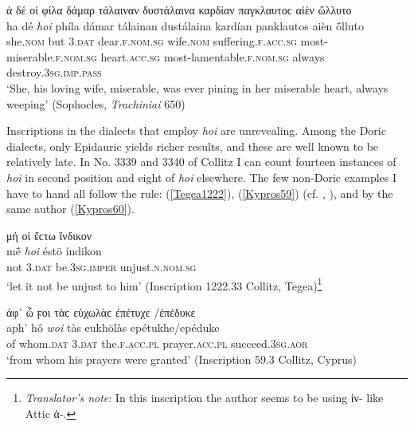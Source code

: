 \begin{exe}
\ex ἁ δέ {οἱ} φίλα δάμαρ τάλαιναν δυστάλαινα καρδίαν παγκλαυτοϲ αἰὲν ὤλλυτο\\
\gll ha dé \emph{hoi} phíla dámar tálainan dustálaina kardían panklautos aièn ṓlluto\\
she.\textsc{nom} but \textsc{3.dat} dear.\textsc{f.nom.sg} wife.\textsc{nom} suffering.\textsc{f.acc.sg} most-miserable.\textsc{f.nom.sg} heart.\textsc{acc.sg} most-lamentable.\textsc{f.nom.sg} always destroy.\textsc{3sg.imp.pass}\\
\trans `She, his loving wife, miserable, was ever pining in her miserable heart, always weeping' (Sophocles, \emph{Trachiniai} 650)
\label{oiTrach}
\end{exe}

Inscriptions in the dialects that employ \emph{hoi} are unrevealing. Among the Doric dialects, only Epidauric yields richer results, and these are well known to be relatively late. In No. 3339 and 3340 of Collitz \citep{Prellwitz1889} I can count fourteen instances of \emph{hoi} in second position and eight of \emph{hoi} elsewhere. The few non-Doric examples I have to hand all follow the rule: (\ref{Tegea1222}), (\ref{Kypros59}) (cf. \citealp[148]{Meister1889}, \citealp[67f.]{Hoffmann1891}), and by the same author (\ref{Kypros60}).

\begin{exe}
\ex μή {οἱ} ἔϲτω ἴνδικον\\
\gll mḗ \emph{hoi} éstō índikon\\
not \textsc{3.dat} be.\textsc{3sg.imper} unjust.\textsc{n.nom.sg}\\
\trans `let it not be unjust to him' (Inscription 1222.33 Collitz, Tegea)\footnote{\emph{Translator's note}: In this inscription the author seems to be using ἰν- like Attic ἀ-.}
\label{Tegea1222}
\end{exe}

\begin{exe}
\ex ἀφ᾽ ὧ ϝοι τὰϲ εὐχωλὰϲ ἐπέτυχε /ἐπέδυκε\\
\gll aph' hô \emph{woi} tàs eukhōlàs epétukhe/epéduke\\
of whom.\textsc{dat} \textsc{3.dat} the.\textsc{f.acc.pl} prayer.\textsc{acc.pl} succeed.\textsc{3sg.aor}\\
\trans `from whom his prayers were granted' (Inscription 59.3 Collitz, Cyprus)
\label{Kypros59}
\end{exe}


